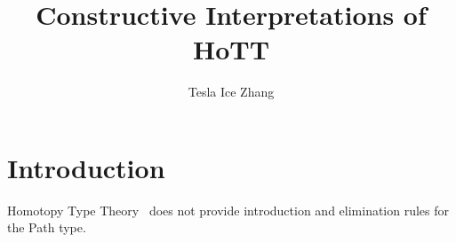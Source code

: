 \documentclass{article}
\title{Constructive Interpretations of HoTT}
\author{Tesla Ice Zhang}
\begin{document}
\maketitle

\tableofcontents

\section{Introduction}

Homotopy Type Theory~\cite{hottbook} does not provide
introduction and elimination rules for the Path type.



\end{document}
